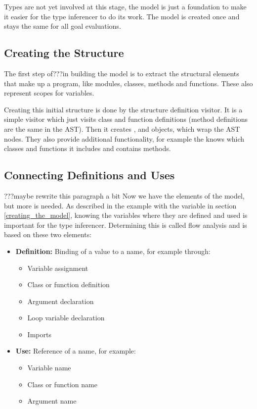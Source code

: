 \documentclass[12pt,halfparskip,DIV11,BCOR10mm]{scrreprt}
\begin{document}
Types are not yet involved at this stage, the model is just a foundation to make it easier for the type inferencer to do its work. The model is created once and stays the same for all goal evaluations.

\subsection{Creating the Structure}

The first step of???in building the model is to extract the structural elements that make up a program, like modules, classes, methods and functions. These also represent scopes for variables.

Creating this initial structure is done by the structure definition visitor. It is a simple visitor which just visits class and function definitions (method definitions are the same in the AST). Then it creates ,  and  objects, which wrap the AST nodes. They also provide additional functionality, for example the  knows which classes and functions it includes and  contains methods.

\subsection{Connecting Definitions and Uses}
\label{connecting_definitions_and_uses}

???maybe rewrite this paragraph a bit Now we have the elements of the model, but more is needed. As described in the example with the  variable in section \vref{creating_the_model}, knowing the variables where they are defined and used is important for the type inferencer. Determining this is called flow analysis and is based on these two elements:

\begin{itemize}
    \item \textbf{Definition:} Binding of a value to a name, for example through:
    \begin{itemize}
        \item Variable assignment
        \item Class or function definition
        \item Argument declaration
        \item Loop variable declaration
        \item Imports
    \end{itemize}
    \item \textbf{Use:} Reference of a name, for example:
    \begin{itemize}
        \item Variable name
        \item Class or function name
        \item Argument name
    \end{itemize}
\end{itemize}
\end{document}
